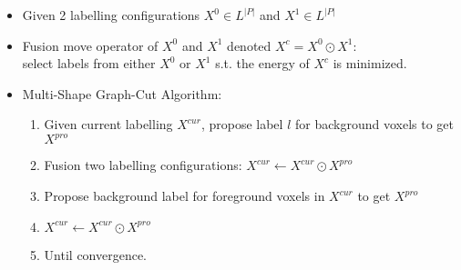 \documentclass[11pt, a4paper, landscape]{article}
\begin{document}
\NewPage{}
\vfill
\begin{itemize}
\item Given 2 labelling configurations $X^0 \in L^{\lvert P \rvert}$ and $X^1 \in L^{\lvert P \rvert}$
\item Fusion move operator of $X^0$ and $X^1$ denoted $X^c = X^0 \odot X^1$:\\
select labels from either $X^0$ or $X^1$ s.t. the energy of $X^c$ is minimized.
\item Multi-Shape Graph-Cut Algorithm:
\begin{enumerate}
\item Given current labelling $X^{cur}$, propose label $l$ for background voxels to get $X^{pro}$
\item Fusion two labelling configurations: $X^{cur} \leftarrow X^{cur} \odot X^{pro}$
\item Propose background label for foreground voxels in $X^{cur}$ to get $X^{pro}$
\item $X^{cur} \leftarrow X^{cur} \odot X^{pro}$
\item Until convergence.
\end{enumerate}
\end{itemize}
\vfill
\end{document}
